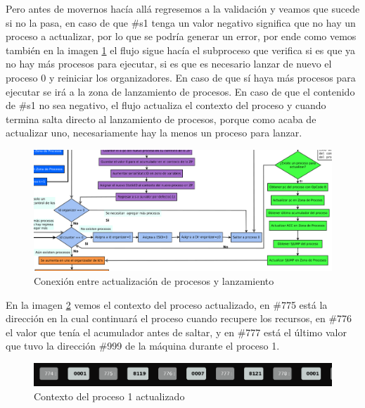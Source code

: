 \documentclass[letterpaper,12pt,oneside]{book}
\begin{document}
		
		Pero antes de movernos hacía allá regresemos a la validación y veamos que sucede si no la pasa, en caso de que \#s1 tenga un valor negativo significa
		que no hay un proceso a actualizar, por lo que se podría generar un error, por ende como vemos también en la imagen \ref{fig:diagConectActLanzamiento}
		el flujo sigue hacía el subproceso que verifica si es que ya no hay más procesos para ejecutar, si es que es necesario lanzar de nuevo el proceso
		0 y reiniciar los organizadores. En caso de que sí haya más procesos para ejecutar se irá a la zona de lanzamiento de procesos. En caso de que el contenido de \#s1 no sea negativo, 
        el flujo actualiza el contexto del proceso y cuando termina salta
        directo al lanzamiento de procesos, porque
		como acaba de actualizar uno, necesariamente hay la menos un proceso para lanzar.
		
		\begin{figure}[ht]		
			\centering
			\includegraphics[scale=0.35]{media/CARDIACC/diagConectActLanzamiento.png}
			\caption{ Conexión entre actualización de procesos y lanzamiento}
			\label{fig:diagConectActLanzamiento}
		\end{figure}		
		
		
		En la imagen \ref{fig:proceso1ZPactualizadaP1} vemos el contexto del proceso actualizado, en \#775 está la dirección en la cual continuará
		el proceso cuando recupere los recursos, en \#776 el valor que tenía el acumulador antes de saltar, y en \#777 está el último valor que tuvo la 
		dirección \#999 de la máquina durante el proceso 1.
		
		
		\begin{figure}[h]		
			\centering
			\includegraphics[scale=0.5]{media/CARDIACC/proceso1ZPactualizadaP1.png}
			\caption{ Contexto del proceso 1 actualizado}
			\label{fig:proceso1ZPactualizadaP1}
		\end{figure}		
		
\end{document}
